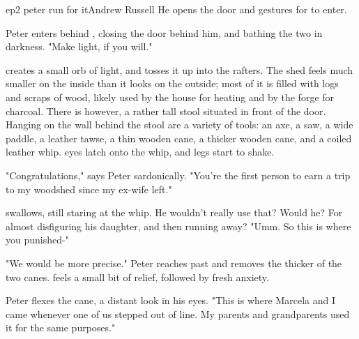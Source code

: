 \documentclass{book}
\begin{document}
\begin{childnode}{ep2 peter run for it}{Andrew Russell}
    He opens the door and gestures for \name{} to enter.


    Peter enters behind \name{}, closing the door behind him, and bathing the two in darkness. "Make light, if you will."

    \name{} creates a small orb of light, and tosses it up into the rafters. The shed feels much smaller on the inside than it looks on the outside; most of it is filled with logs and scraps of wood, likely used by the house for heating and by the forge for charcoal.
    There is however, a rather tall stool situated in front of the door. Hanging on the wall behind the stool are a variety of tools: an axe, a saw, a wide paddle, a leather tawse, a thin wooden cane, a thicker wooden cane, and a coiled leather whip. 
    \names{} eyes latch onto the whip, and \hisher{} legs start to shake.

    "Congratulations," says Peter sardonically. "You're the first person to earn a trip to my woodshed since my ex-wife left."

    \name{} swallows, still staring at the whip. He wouldn't really use that? Would he? For almost disfiguring his daughter, and then running away? "Umm. So this is where you punished-"

    "We would be more precise." Peter reaches past \name{} and removes the thicker of the two canes. \name{} feels a small bit of relief, followed by fresh anxiety.

    Peter flexes the cane, a distant look in his eyes. "This is where Marcela and I came whenever one of us stepped out of line. My parents and grandparents used it for the same purposes."



\end{childnode}
\end{document}
